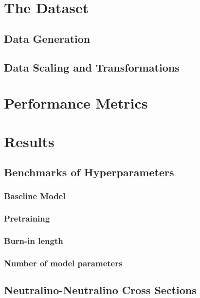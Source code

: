 \section{The Dataset}\label{sec:dataset}
\subsection{Data Generation}
\subsection{Data Scaling and Transformations}
\section{Performance Metrics}\label{seq:perf_metrics}
\section{Results}\label{sec:results}
\subsection{Benchmarks of Hyperparameters}\label{subsec:benchmarks}
\subsubsection{Baseline Model}
\subsubsection{Pretraining}
\subsubsection{Burn-in length}
\subsubsection{Number of model parameters}

\subsection{Neutralino-Neutralino Cross Sections}\label{subsec:neuralino_experiments}
